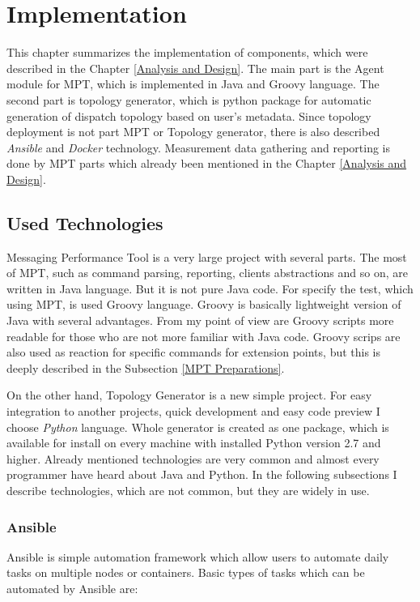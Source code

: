 \chapter{Implementation}
\label{Implementation}
This chapter summarizes the implementation of components, which were described in the Chapter \ref{Analysis and Design}. The main part is the Agent module for MPT, which is implemented in Java and Groovy language. The second part is topology generator, which is python package for automatic generation of dispatch topology based on user's metadata. Since topology deployment is not part MPT or Topology generator, there is also described \emph{Ansible} and \emph{Docker} technology. Measurement data gathering and reporting is done by MPT parts which already been mentioned in the Chapter \ref{Analysis and Design}.   


\section{Used Technologies}
Messaging Performance Tool is a very large project with several parts. The most of MPT, such as command parsing, reporting, clients abstractions and so on, are written in Java language. But it is not pure Java code. For specify the test, which using MPT, is used Groovy language. Groovy is basically lightweight version of Java with several advantages. From my point of view are Groovy scripts more readable for those who are not more familiar with Java code. Groovy scrips are also used as reaction for specific commands for extension points, but this is deeply described in the Subsection \ref{MPT Preparations}.

On the other hand, Topology Generator is a new simple project. For easy integration to another projects, quick development and easy code preview I choose \emph{Python} language. Whole generator is created as one package, which is available for install on every machine with installed Python version 2.7 and higher. Already mentioned technologies are very common and almost every programmer have heard about Java and Python. In the following subsections I describe technologies, which are not common, but they are widely in use.

\subsection{Ansible}
Ansible \cite{Ansible} is simple automation framework which allow users to automate daily tasks on multiple nodes or containers. Basic types of tasks which can be automated by Ansible are:

